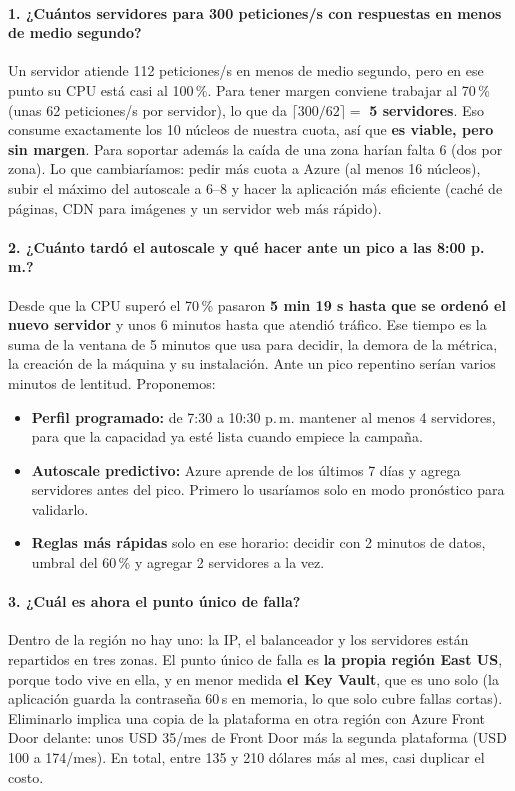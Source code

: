 \documentclass[11pt,letterpaper]{article}
\begin{document}
\paragraph{1. ¿Cuántos servidores para 300 peticiones/s con respuestas en menos de medio segundo?}
Un servidor atiende 112 peticiones/s en menos de medio segundo, pero en ese punto su CPU está
casi al 100\,\%. Para tener margen conviene trabajar al 70\,\% (unas 62 peticiones/s por
servidor), lo que da $\lceil 300/62\rceil = $ \textbf{5 servidores}. Eso consume exactamente los
10 núcleos de nuestra cuota, así que \textbf{es viable, pero sin margen}. Para soportar además la
caída de una zona harían falta 6 (dos por zona). Lo que cambiaríamos: pedir más cuota a Azure
(al menos 16 núcleos), subir el máximo del autoscale a 6--8 y hacer la aplicación más eficiente
(caché de páginas, CDN para imágenes y un servidor web más rápido).

\paragraph{2. ¿Cuánto tardó el autoscale y qué hacer ante un pico a las 8:00 p.\,m.?}
Desde que la CPU superó el 70\,\% pasaron \textbf{5 min 19 s hasta que se ordenó el nuevo servidor}
y unos 6 minutos hasta que atendió tráfico. Ese tiempo es la suma de la ventana de 5 minutos que
usa para decidir, la demora de la métrica, la creación de la máquina y su instalación. Ante un pico
repentino serían varios minutos de lentitud. Proponemos:
\begin{itemize}
  \item \textbf{Perfil programado:} de 7:30 a 10:30 p.\,m. mantener al menos 4 servidores, para que
        la capacidad ya esté lista cuando empiece la campaña.
  \item \textbf{Autoscale predictivo:} Azure aprende de los últimos 7 días y agrega servidores antes
        del pico. Primero lo usaríamos solo en modo pronóstico para validarlo.
  \item \textbf{Reglas más rápidas} solo en ese horario: decidir con 2 minutos de datos, umbral del
        60\,\% y agregar 2 servidores a la vez.
\end{itemize}

\paragraph{3. ¿Cuál es ahora el punto único de falla?}
Dentro de la región no hay uno: la IP, el balanceador y los servidores están repartidos en tres
zonas. El punto único de falla es \textbf{la propia región East US}, porque todo vive en ella, y en
menor medida \textbf{el Key Vault}, que es uno solo (la aplicación guarda la contraseña 60\,s en
memoria, lo que solo cubre fallas cortas). Eliminarlo implica una copia de la plataforma en otra
región con Azure Front Door delante: unos USD 35/mes de Front Door más la segunda plataforma
(USD 100 a 174/mes). En total, entre 135 y 210 dólares más al mes, casi duplicar el costo.
\end{document}
